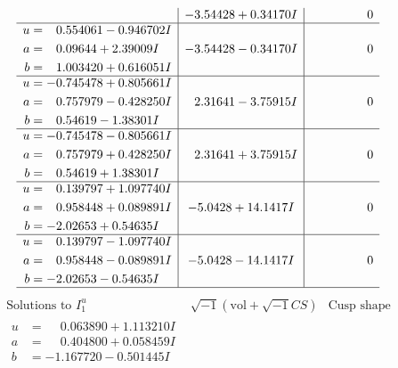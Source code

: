 \documentclass[1p]{elsarticle_modified}
\theoremstyle{definition}
\newcommand{\I}{\sqrt{-1}}
\begin{document}
$$\begin{array}{c|c|c}
 & -3.54428 + 0.34170 I & \phantom{-0.000000 } 0 \\ \hline\begin{aligned}
u &= \phantom{-}0.554061 - 0.946702 I \\
a &= \phantom{-}0.09644 + 2.39009 I \\
b &= \phantom{-}1.003420 + 0.616051 I\end{aligned}
 & -3.54428 - 0.34170 I & \phantom{-0.000000 } 0 \\ \hline\begin{aligned}
u &= -0.745478 + 0.805661 I \\
a &= \phantom{-}0.757979 - 0.428250 I \\
b &= \phantom{-}0.54619 - 1.38301 I\end{aligned}
 & \phantom{-}2.31641 - 3.75915 I & \phantom{-0.000000 } 0 \\ \hline\begin{aligned}
u &= -0.745478 - 0.805661 I \\
a &= \phantom{-}0.757979 + 0.428250 I \\
b &= \phantom{-}0.54619 + 1.38301 I\end{aligned}
 & \phantom{-}2.31641 + 3.75915 I & \phantom{-0.000000 } 0 \\ \hline\begin{aligned}
u &= \phantom{-}0.139797 + 1.097740 I \\
a &= \phantom{-}0.958448 + 0.089891 I \\
b &= -2.02653 + 0.54635 I\end{aligned}
 & -5.0428 + 14.1417 I & \phantom{-0.000000 } 0 \\ \hline\begin{aligned}
u &= \phantom{-}0.139797 - 1.097740 I \\
a &= \phantom{-}0.958448 - 0.089891 I \\
b &= -2.02653 - 0.54635 I\end{aligned}
 & -5.0428 - 14.1417 I & \phantom{-0.000000 } 0\\
 \hline 
 \end{array}$$\newpage$$\begin{array}{c|c|c}  
\text{Solutions to }I^u_{1}& \I (\text{vol} + \sqrt{-1}CS) & \text{Cusp shape}\\
 \hline 
\begin{aligned}
u &= \phantom{-}0.063890 + 1.113210 I \\
a &= \phantom{-}0.404800 + 0.058459 I \\
b &= -1.167720 - 0.501445 I\end{aligned}

\end{array}$$
\end{document}
